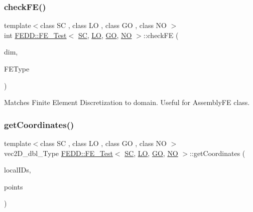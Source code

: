 \subsubsection{\texorpdfstring{check\+F\+E()}{checkFE()}}
{\footnotesize\ttfamily template$<$class SC , class LO , class GO , class NO $>$ \\
int \hyperlink{classFEDD_1_1FE__Test}{F\+E\+D\+D\+::\+F\+E\+\_\+\+Test}$<$ \hyperlink{fe__test__laplace_8cpp_a79c7e86a57edbb2a5a53242bcd04e41e}{SC}, \hyperlink{fe__test__laplace_8cpp_ad6a38c9f07d3fd633eefca5bccad8410}{LO}, \hyperlink{fe__test__laplace_8cpp_afa2946b509009b4f45eb04bd8c5b27d9}{GO}, \hyperlink{fe__test__laplace_8cpp_a5e24f37b28787429872b6ecb1d0417ce}{NO} $>$\+::check\+FE (\begin{DoxyParamCaption}\item[{int}]{dim,  }\item[{string}]{F\+E\+Type }\end{DoxyParamCaption})\hspace{0.3cm}{\ttfamily [private]}}



Matches Finite Element Discretization to domain. Useful for Assembly\+FE class. 

\mbox{\label{classFEDD_1_1FE__Test_a60f1f1b498d11e9953349cd1ba532527}} 
\subsubsection{\texorpdfstring{get\+Coordinates()}{getCoordinates()}}
{\footnotesize\ttfamily template$<$class SC , class LO , class GO , class NO $>$ \\
vec2\+D\+\_\+dbl\+\_\+\+Type \hyperlink{classFEDD_1_1FE__Test}{F\+E\+D\+D\+::\+F\+E\+\_\+\+Test}$<$ \hyperlink{fe__test__laplace_8cpp_a79c7e86a57edbb2a5a53242bcd04e41e}{SC}, \hyperlink{fe__test__laplace_8cpp_ad6a38c9f07d3fd633eefca5bccad8410}{LO}, \hyperlink{fe__test__laplace_8cpp_afa2946b509009b4f45eb04bd8c5b27d9}{GO}, \hyperlink{fe__test__laplace_8cpp_a5e24f37b28787429872b6ecb1d0417ce}{NO} $>$\+::get\+Coordinates (\begin{DoxyParamCaption}\item[{vec\+\_\+\+L\+O\+\_\+\+Type}]{local\+I\+Ds,  }\item[{vec2\+D\+\_\+dbl\+\_\+ptr\+\_\+\+Type}]{points }\end{DoxyParamCaption})\hspace{0.3cm}{\ttfamily [private]}}



